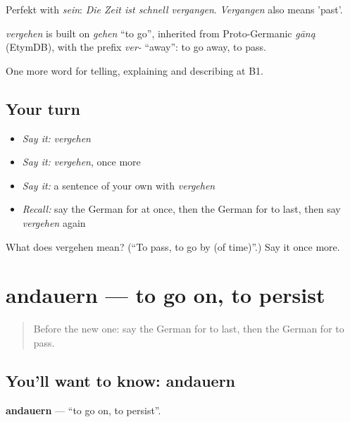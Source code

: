 Perfekt with \emph{sein}: \emph{Die Zeit ist schnell vergangen}. \emph{Vergangen} also means 'past'.

\begin{cousinweb}
\emph{vergehen} is built on \emph{gehen} \textquotedblleft{}to go\textquotedblright{}, inherited from Proto-Germanic \emph{gāną} (EtymDB), with the prefix \emph{ver-} \textquotedblleft{}away\textquotedblright{}: to go away, to pass.
\end{cousinweb}

\begin{grammarlens}[title={What you've built}]
One more word for telling, explaining and describing at B1.
\end{grammarlens}

\subsection*{Your turn}
\begin{itemize}
\raggedright
  \item \emph{Say it:} \emph{vergehen}
  \item \emph{Say it:} \emph{vergehen}, once more
  \item \emph{Say it:} a sentence of your own with \emph{vergehen}
  \item \emph{Recall:} say the German for at once, then the German for to last, then say \emph{vergehen} again
\end{itemize}

\begin{tcolorbox}[breakable,colback=teal!4,colframe=teal!35!black,title={Before you move on}]
What does vergehen mean? (\textquotedblleft{}To pass, to go by (of time)\textquotedblright{}.) Say it once more.
\end{tcolorbox}
\section[andauern]{andauern — to go on, to persist}

\label{lesson:GE-C267-andauern}



\begin{quote}
Before the new one: say the German for to last, then the German for to pass.
\end{quote}

\subsection*{You'll want to know: andauern}
\textbf{andauern} — \textquotedblleft{}to go on, to persist\textquotedblright{}.

